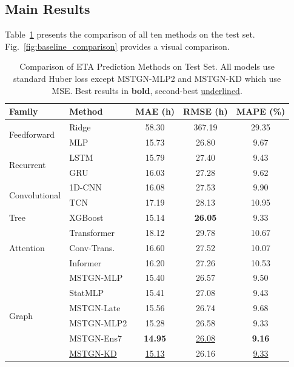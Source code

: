 \documentclass[conference]{IEEEtran}
\begin{document}
\subsection{Main Results}

Table~\ref{tab:main_results} presents the comparison of all ten methods on the test set.
Fig.~\ref{fig:baseline_comparison} provides a visual comparison.

\begin{table}[t]
    \centering
    \caption{Comparison of ETA Prediction Methods on Test Set. All models use standard Huber loss except MSTGN-MLP2 and MSTGN-KD which use MSE. Best results in \textbf{bold}, second-best \underline{underlined}.}
    \label{tab:main_results}
    \begin{tabular}{llccc}
        \toprule
        \textbf{Family} & \textbf{Method} & \textbf{MAE (h)} & \textbf{RMSE (h)} & \textbf{MAPE (\%)} \\
        \midrule
        \multirow{2}{*}{Feedforward} & Ridge & 58.30 & 367.19 & 29.35 \\
        & MLP & 15.73 & 26.80 & 9.67 \\
        \midrule
        \multirow{2}{*}{Recurrent} & LSTM & 15.79 & 27.40 & 9.43 \\
        & GRU & 16.03 & 27.28 & 9.62 \\
        \midrule
        \multirow{2}{*}{Convolutional} & 1D-CNN & 16.08 & 27.53 & 9.90 \\
        & TCN & 17.19 & 28.13 & 10.95 \\
        \midrule
        Tree & XGBoost & 15.14 & \textbf{26.05} & 9.33 \\
        \midrule
        \multirow{3}{*}{Attention} & Transformer & 18.12 & 29.78 & 10.67 \\
        & Conv-Trans. & 16.60 & 27.52 & 10.07 \\
        & Informer & 16.20 & 27.26 & 10.53 \\
        \midrule
        \multirow{7}{*}{Graph} & MSTGN-MLP & 15.40 & 26.57 & 9.50 \\
        & StatMLP & 15.41 & 27.08 & 9.43 \\
        & MSTGN-Late & 15.56 & 26.74 & 9.68 \\
        & MSTGN-MLP2 & 15.28 & 26.58 & 9.33 \\
        & MSTGN-Ens7 & \textbf{14.95} & \underline{26.08} & \textbf{9.16} \\
        & \underline{MSTGN-KD} & \underline{15.13} & 26.16 & \underline{9.33} \\
        \bottomrule
    \end{tabular}
\end{table}
\end{document}
